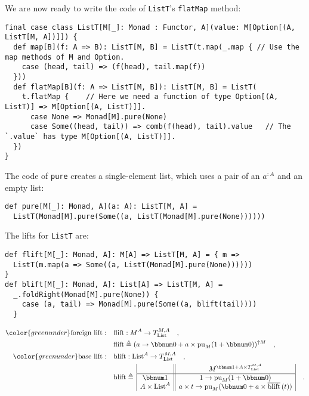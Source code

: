 We are now ready to write the code of \lstinline!ListT!\textsf{'}s \lstinline!flatMap!
method:
\begin{lstlisting}
final case class ListT[M[_]: Monad : Functor, A](value: M[Option[(A, ListT[M, A])]]) {
  def map[B](f: A => B): ListT[M, B] = ListT(t.map(_.map { // Use the map methods of M and Option.
    case (head, tail) => (f(head), tail.map(f))
  }))
  def flatMap[B](f: A => ListT[M, B]): ListT[M, B] = ListT(
    t.flatMap {    // Here we need a function of type Option[(A, ListT)] => M[Option[(A, ListT)]].
      case None => Monad[M].pure(None)
      case Some((head, tail)) => comb(f(head), tail).value   // The `.value` has type M[Option[(A, ListT)]].
  })
}
\end{lstlisting}
The code of \lstinline!pure! creates a single-element list, which
uses a pair of an $a^{:A}$ and an empty list:
\begin{lstlisting}
def pure[M[_]: Monad, A](a: A): ListT[M, A] =
  ListT(Monad[M].pure(Some((a, ListT(Monad[M].pure(None))))))
\end{lstlisting}
The lifts for \lstinline!ListT! are:
\begin{lstlisting}
def flift[M[_]: Monad, A]: M[A] => ListT[M, A] = { m =>
  ListT(m.map(a => Some((a, ListT(Monad[M].pure(None))))))
}
def blift[M[_]: Monad, A]: List[A] => ListT[M, A] =
  _.foldRight(Monad[M].pure(None)) {
    case (a, tail) => Monad[M].pure(Some((a, blift(tail))))
  }
\end{lstlisting}
\begin{align*}
{\color{greenunder}\text{foreign lift}:}\quad & \text{flift}:M^{A}\rightarrow T_{\text{List}}^{M,A}\quad,\\
 & \text{flift}\triangleq(a\rightarrow\bbnum 0+a\times\text{pu}_{M}(1+\bbnum 0))^{\uparrow M}\quad,\\
{\color{greenunder}\text{base lift}:}\quad & \text{blift}:\text{List}^{A}\rightarrow T_{\text{List}}^{M,A}\quad,\\
 & \text{blift}\triangleq\,\begin{array}{|c||c|}
 & M^{\bbnum 1+A\times T_{\text{List}}^{M,A}}\\
\hline \bbnum 1 & 1\rightarrow\text{pu}_{M}(1+\bbnum 0)\\
A\times\text{List}^{A} & a\times t\rightarrow\text{pu}_{M}(\bbnum 0+a\times\overline{\text{blift}}\,(t))
\end{array}\quad.
\end{align*}

